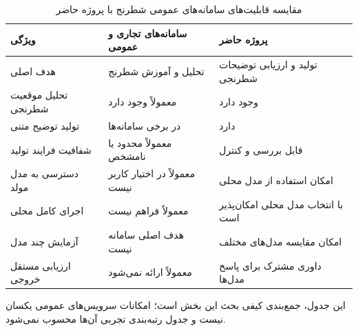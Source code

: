 \begin{table}[htbp]
\centering
\caption{مقایسه قابلیت‌های سامانه‌های عمومی شطرنج با پروژه حاضر}
\label{tab:related-systems}
\begingroup
\small{}\renewcommand{\arraystretch}{1.45}
\setlength{\tabcolsep}{7pt}
\begin{tabularx}{\linewidth}{>{\raggedleft\arraybackslash}p{3.5cm} >{\raggedleft\arraybackslash}X >{\raggedleft\arraybackslash}X}
\toprule
\rowcolor{gray!22}
\textbf{ویژگی} & \textbf{سامانه‌های تجاری و عمومی} & \textbf{پروژه حاضر} \\
\midrule
هدف اصلی & تحلیل و آموزش شطرنج & تولید و ارزیابی توضیحات شطرنجی \\
تحلیل موقعیت شطرنجی & معمولاً وجود دارد & وجود دارد \\
تولید توضیح متنی & در برخی سامانه‌ها & دارد \\
شفافیت فرایند تولید & معمولاً محدود یا نامشخص & قابل بررسی و کنترل \\
دسترسی به مدل مولد & معمولاً در اختیار کاربر نیست & امکان استفاده از مدل محلی \\
اجرای کامل محلی & معمولاً فراهم نیست & با انتخاب مدل محلی امکان‌پذیر است \\
آزمایش چند مدل & هدف اصلی سامانه نیست & امکان مقایسه مدل‌های مختلف \\
ارزیابی مستقل خروجی & معمولاً ارائه نمی‌شود & داوری مشترک برای پاسخ مدل‌ها \\
\bottomrule
\end{tabularx}
\endgroup
\par\smallskip
{\footnotesize این جدول، جمع‌بندی کیفی بحث این بخش است؛ امکانات سرویس‌های عمومی یکسان نیست و جدول رتبه‌بندی تجربی آن‌ها محسوب نمی‌شود.}
\end{table}

